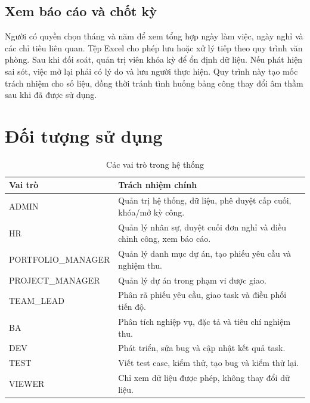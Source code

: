 \documentclass[12pt,a4paper,oneside]{report}
\begin{document}
\subsection{Xem báo cáo và chốt kỳ}
Người có quyền chọn tháng và năm để xem tổng hợp ngày làm việc, ngày nghỉ và các chỉ tiêu liên quan. Tệp Excel cho phép lưu hoặc xử lý tiếp theo quy trình văn phòng. Sau khi đối soát, quản trị viên khóa kỳ để ổn định dữ liệu. Nếu phát hiện sai sót, việc mở lại phải có lý do và lưu người thực hiện. Quy trình này tạo mốc trách nhiệm cho số liệu, đồng thời tránh tình huống bảng công thay đổi âm thầm sau khi đã được sử dụng.

\section{Đối tượng sử dụng}
\begin{table}[H]\centering\caption{Các vai trò trong hệ thống}
\begin{tabularx}{\textwidth}{p{3.3cm}X}\toprule
\textbf{Vai trò}&\textbf{Trách nhiệm chính}\\\midrule
ADMIN&Quản trị hệ thống, dữ liệu, phê duyệt cấp cuối, khóa/mở kỳ công.\\
HR&Quản lý nhân sự, duyệt cuối đơn nghỉ và điều chỉnh công, xem báo cáo.\\
PORTFOLIO\_MANAGER&Quản lý danh mục dự án, tạo phiếu yêu cầu và nghiệm thu.\\
PROJECT\_MANAGER&Quản lý dự án trong phạm vi được giao.\\
TEAM\_LEAD&Phân rã phiếu yêu cầu, giao task và điều phối tiến độ.\\
BA&Phân tích nghiệp vụ, đặc tả và tiêu chí nghiệm thu.\\
DEV&Phát triển, sửa bug và cập nhật kết quả task.\\
TEST&Viết test case, kiểm thử, tạo bug và kiểm thử lại.\\
VIEWER&Chỉ xem dữ liệu được phép, không thay đổi dữ liệu.\\\bottomrule
\end{tabularx}\end{table}
\end{document}
